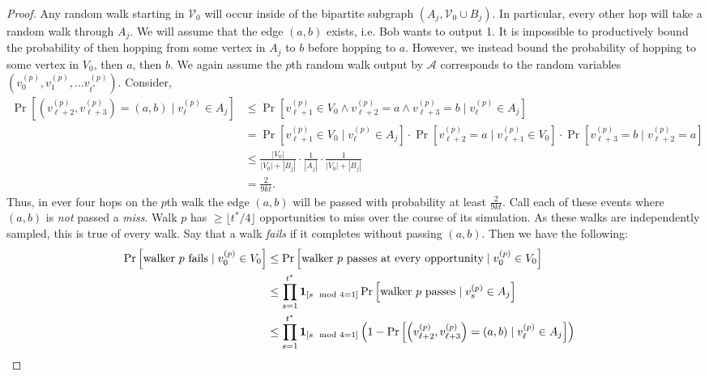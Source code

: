 \documentclass[10]{report}
\begin{document}
\begin{proof}
Any random walk starting in $\mathcal{V}_0$ will occur inside of the bipartite subgraph $(A_j, \mathcal{V}_0 \cup B_j)$.
In particular, every other hop will take a random walk through $A_j$. 
We will assume that the edge $(a, b)$ exists, i.e. Bob wants to output 1.
It is impossible to productively bound the probability of then hopping from some vertex in $A_j$ to $b$ before hopping to $a$.
However, we instead bound the probability of hopping to some vertex in $V_0$, then $a$, then $b$.
We again assume the $p$th random walk output by $\mathcal{A}$ corresponds to the random variables $\left ( v_0^{(p)}, v_1^{(p)}, \dots v_{t^*}^{(p)} \right)$.
Consider,
%
\begin{align}
\nonumber
\Pr \left [ \left ( v_{\ell+2}^{(p)}, v_{\ell+3}^{(p)} \right ) = (a ,b) \mid v_\ell^{(p)} \in A_j \right ]
&\leq
\Pr \left [ v_{\ell+1}^{(p)} \in V_0 \wedge v_{\ell+2}^{(p)} = a \wedge v_{\ell+3}^{(p)} = b \mid v_{\ell}^{(p)} \in A_j \right ]
\\
\nonumber
&=
\Pr[v_{\ell+1}^{(p)} \in V_0 \mid v_\ell^{(p)} \in A_j] \cdot
\Pr[v_{\ell+2}^{(p)} = a \mid v_{\ell+1}^{(p)} \in V_0] \cdot
\Pr[v_{\ell+3}^{(p)} = b \mid v_{\ell+2}^{(p)} = a] 
\\
\nonumber
&\leq
\frac{|V_0|}{|V_0| + |B_j|} \cdot \frac{1}{|A_j|} \cdot \frac{1}{|V_0| + |B_j|}
\\
\label{eq:rw:lb}
&=
\frac{2}{9kt}.
\end{align}
%
Thus, in ever four hops on the $p$th walk the edge $(a,b)$ will be passed with probability at least $\frac{2}{9kt}$.
Call each of these events where $(a,b)$ is \emph{not} passed a \emph{miss}.
Walk $p$ has $\geq \lfloor t^*/4 \rfloor$ opportunities to miss over the course of its simulation.
As these walks are independently sampled, this is true of every walk. 
Say that a walk \emph{fails} if it completes without passing $(a,b)$.
Then we have the following:
%
\begin{align*}
\Pr \left [ \textnormal{walker $p$ fails} \mid v_0^{(p)} \in V_0 \right ]
&\leq
\Pr \left [ \textnormal{walker $p$ passes at every opportunity} \mid v_{0}^{(p)} \in V_0 \right ]
&
\\
&\leq
\prod\limits_{s = 1}^{t^*} 
\mathbf{1}_{[s\mod 4 = 1]}
\Pr \left [ \textnormal{walker $p$ passes} \mid v_{s}^{(p)} \in A_j \right ]
&
\\
&\leq
\prod\limits_{s = 1}^{t^*} 
\mathbf{1}_{[s\mod 4 = 1]}
\left ( 1 - \Pr \left [ \left ( v_{\ell+2}^{(p)}, v_{\ell+3}^{(p)} \right ) = (a ,b) \mid v_\ell^{(p)} \in A_j \right ] \right )
&
\\

\end{align*}
\end{proof}
\end{document}
